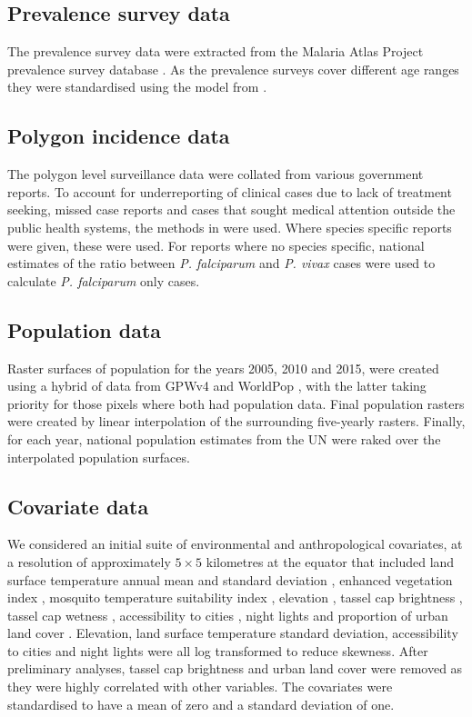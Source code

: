 \documentclass[10pt,letterpaper]{article}
\begin{document}
\subsection*{Prevalence survey data}

The prevalence survey data were extracted from the Malaria Atlas Project prevalence survey database \cite{bhatt2015effect}.
As the prevalence surveys cover different age ranges they were standardised using the model from \cite{smith2007standardizing}.


\subsection*{Polygon incidence data}

The polygon level surveillance data were collated from various government reports.
To account for underreporting of clinical cases due to lack of treatment seeking, missed case reports and cases that sought medical attention outside the public health systems, the methods in \cite{cibulskis2011worldwide} were used.
Where species specific reports were given, these were used. 
For reports where no species specific, national estimates of the ratio between \emph{P. falciparum} and \emph{P. vivax} cases were used to calculate \emph{P. falciparum} only cases.



\subsection*{Population data}

Raster surfaces of population for the years 2005, 2010 and 2015, were created using a hybrid of data from GPWv4 \cite{gpw4} and WorldPop \cite{tatem2017worldpop}, with the latter taking priority for those pixels where both had population data. 
Final population rasters were created by linear interpolation of the surrounding five-yearly rasters.
Finally, for each year, national population estimates from the UN were raked over the interpolated population surfaces. 

\subsection*{Covariate data}

We considered an initial suite of environmental and anthropological covariates, at a resolution of approximately $5 \times 5$ kilometres at the equator that included land surface temperature annual mean and standard deviation \cite{LST}, enhanced vegetation index \cite{TCB}, mosquito temperature suitability index \cite{weiss2014air}, elevation \cite{SRTMElev}, tassel cap brightness \cite{TCB}, tassel cap wetness \cite{TCB}, accessibility to cities \cite{weiss2018global}, night lights \cite{} and proportion of urban land cover \cite{}.
Elevation, land surface temperature standard deviation, accessibility to cities and night lights were all log transformed to reduce skewness.
After preliminary analyses, tassel cap brightness and urban land cover were removed as they were highly correlated with other variables.
The covariates were standardised to have a mean of zero and a standard deviation of one.
\end{document}
